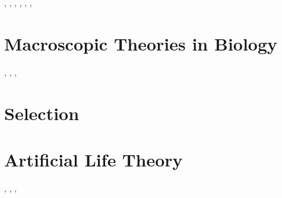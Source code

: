 \documentclass[]{article}
\begin{document}
\cite{huelsenbeck2001mrbayes}, \cite{huelsenbeck1997phylogeny}, \cite{hug2016new}, \cite{philippe2005heterotachy}, \cite{quast2012silva}, \cite{sanderson2003r8s}, \cite{smit2007evolutionary}

\section{Macroscopic Theories in Biology}

\cite{white2005allometric}, \cite{west1997general}, \cite{kempes2011predicting}, \cite{kempes2016evolutionary}
\section{Selection}

\cite{darwin1859origin}

\section{Artificial Life Theory}

\cite{neumann1966theory}, \cite{neumann1958computer}, \cite{janzing2010there}, \cite{schaeffer2014physicallyuniversal}


\printglossaries

 


\end{document}
